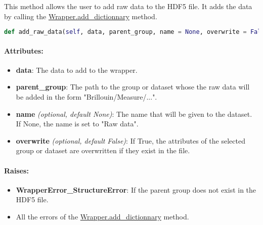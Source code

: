 This method allows the user to add raw data to the HDF5 file. It adds the data by calling the \hyperref[subsec:wrapper.add_dictionnary]{Wrapper.add\_dictionnary} method.

\begin{lstlisting}[language=Python]
def add_raw_data(self, data, parent_group, name = None, overwrite = False):
\end{lstlisting}

\paragraph{Attributes:}

\begin{itemize}
    \item \textbf{data}: The data to add to the wrapper. 
    \item \textbf{parent\_group}: The path to the group or dataset whose the raw data will be added in the form "Brillouin/Measure/...".
    \item \textbf{name} \textit{(optional, default None)}: The name that will be given to the dataset. If None, the name is set to "Raw data".
    \item \textbf{overwrite} \textit{(optional, default False)}: If True, the attributes of the selected group or dataset are overwritten if they exist in the file.
\end{itemize}

\paragraph{Raises:}
\begin{itemize}
    \item \textbf{WrapperError\_StructureError}: If the parent group does not exist in the HDF5 file.
    \item All the errors of the \hyperref[subsec:wrapper.add_dictionnary]{Wrapper.add\_dictionnary} method.
\end{itemize}
